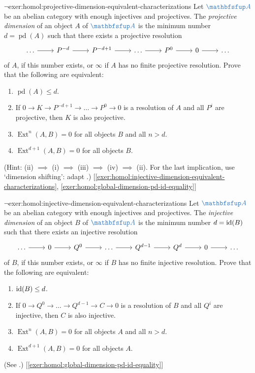 \begin{exer}{$\lnot$}{exer:homol:projective-dimension-equivalent-characterizations}
  Let $\categ{A}$ be an abelian category with enough injectives and
  projectives. The \emph{projective dimension} of an object $A$ of
  $\categ{A}$ is the minimum number $d = \operatorname{pd}(A)$ such
  that there exists a projective resolution
  \[\begin{tikzcd}
      \dots \arrow[r] & P^{-d} \arrow[r] & P^{-d+1} \arrow[r] & \dots
      \arrow[r] & P^0 \arrow[r] & 0 \arrow[r] & \dots
    \end{tikzcd}\] of $A$, if this number exists, or $\infty$ if $A$
  has no finite projective resolution. Prove that the following are
  equivalent:
  \begin{enumerate}[label=(\roman*)]
  \item $\operatorname{pd}(A) \le d$.
  \item If $0 \to K \to P^{-d+1} \to \dots \to P^0 \to 0$ is a
    resolution of $A$ and all $P^i$ are projective, then $K$ is also
    projective.
  \item $\operatorname{Ext}^n(A, B) = 0$ for all objects $B$ and all
    $n > d$.
  \item $\operatorname{Ext}^{d+1}(A, B) = 0$ for all objects $B$.
  \end{enumerate}
  (Hint: (ii) $\implies$ (i) $\implies$ (iii) $\implies$ (iv)
  $\implies$ (ii). For the last implication, use `dimension shifting':
  adapt .)
  [\ref{exer:homol:injective-dimension-equivalent-characterizations},
  \ref{exer:homol:global-dimension-pd-id-equality}]
\end{exer}
\begin{exer}{$\lnot$}{exer:homol:injective-dimension-equivalent-characterizations}
  Let $\categ{A}$ be an abelian category with enough injectives and
  projectives. The \emph{injective dimension} of an object $B$ of
  $\categ{A}$ is the minimum number $d = \operatorname{id}(B)$ such that there
  exists an injective resolution
  \[\begin{tikzcd}
      \dots \arrow[r] & 0 \arrow[r] & Q^0 \arrow[r] & \dots \arrow[r]
      & Q^{d-1} \arrow[r] & Q^d \arrow[r] & 0 \arrow[r] & \dots
    \end{tikzcd}\] of $B$, if this number exists, or $\infty$ if $B$
  has no finite injective resolution. Prove that the following are
  equivalent:
  \begin{enumerate}[label=(\roman*)]
  \item $\operatorname{id}(B) \le d$.
  \item If $0 \to Q^0 \to \dots \to Q^{d-1} \to C \to 0$ is a
    resolution of $B$ and all $Q^i$ are injective, then $C$ is also
    injective.
  \item $\operatorname{Ext}^n(A, B) = 0$ for all objects $A$ and all
    $n > d$.
  \item $\operatorname{Ext}^{d+1}(A, B) = 0$ for all objects $A$.
  \end{enumerate}
  (See
  .)
  [\ref{exer:homol:global-dimension-pd-id-equality}]
\end{exer}

